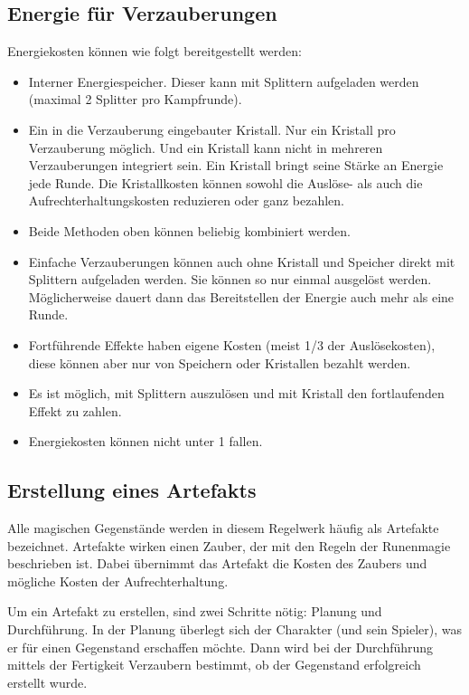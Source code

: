 \documentclass{article}
\begin{document}
\begin{center}
\subsection{Energie für Verzauberungen}
\end{center}

Energiekosten können wie folgt bereitgestellt werden:

\begin{itemize}
\item Interner Energiespeicher. Dieser kann mit Splittern aufgeladen werden (maximal 2 Splitter pro Kampfrunde).
\item Ein in die Verzauberung eingebauter Kristall. Nur ein Kristall pro Verzauberung möglich. Und ein Kristall kann nicht in mehreren Verzauberungen integriert sein. Ein Kristall bringt seine Stärke an Energie jede Runde. Die Kristallkosten können sowohl die Auslöse- als auch die Aufrechterhaltungskosten reduzieren oder ganz bezahlen.
\item Beide Methoden oben können beliebig kombiniert werden.
\item Einfache Verzauberungen können auch ohne Kristall und Speicher direkt mit Splittern aufgeladen werden. Sie können so nur einmal ausgelöst werden. Möglicherweise dauert dann das Bereitstellen der Energie auch mehr als eine Runde.
\item Fortführende Effekte haben eigene Kosten (meist 1/3 der Auslösekosten), diese können aber nur von Speichern oder Kristallen bezahlt werden.
\item Es ist möglich, mit Splittern auszulösen und mit Kristall den fortlaufenden Effekt zu zahlen.
\item Energiekosten können nicht unter 1 fallen.
\end{itemize}

\begin{center}
\subsection{Erstellung eines Artefakts}
\end{center}

Alle magischen Gegenstände werden in diesem Regelwerk häufig als Artefakte bezeichnet. Artefakte wirken einen Zauber,
der mit den Regeln der Runenmagie beschrieben ist. Dabei übernimmt das Artefakt die Kosten des Zaubers und mögliche
Kosten der Aufrechterhaltung.

Um ein Artefakt zu erstellen, sind zwei Schritte nötig: Planung und Durchführung. In der Planung überlegt sich der
Charakter (und sein Spieler), was er für einen Gegenstand erschaffen möchte. Dann wird bei der Durchführung mittels
der Fertigkeit Verzaubern bestimmt, ob der Gegenstand erfolgreich erstellt wurde.
\end{document}
